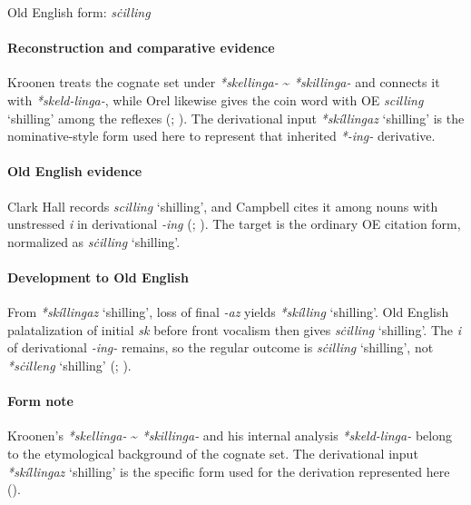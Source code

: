 \documentclass[
  british,
  a4paper,
]{article}
\providecommand{\Recon}[1]{\emph{*#1}}
\begin{document}
Old English form: \emph{sċilling}

\paragraph{Reconstruction and comparative
evidence}\label{reconstruction-and-comparative-evidence-51}

Kroonen treats the cognate set under \emph{*skellinga-}
\textasciitilde{} \emph{*skillinga-} and connects it with
\emph{*skeld-linga-}, while Orel likewise gives the coin word with OE
{\emph{scilling}} `shilling' among the reflexes
(; ). The derivational input \Recon{skíllingaz} `shilling' is the
nominative-style form used here to represent that inherited
\emph{*-ing-} derivative.

\paragraph{Old English evidence}\label{old-english-evidence-53}

Clark Hall records \emph{scilling} `shilling', and Campbell cites it
among nouns with unstressed \emph{i} in derivational \emph{-ing}
(;
). The target is the ordinary
OE citation form, normalized as \emph{sċilling} `shilling'.

\paragraph{Development to Old
English}\label{development-to-old-english-52}

From \Recon{skíllingaz} `shilling', loss of final \emph{-az} yields
\Recon{skílling} `shilling'. Old English palatalization of initial
\emph{sk} before front vocalism then gives \emph{sċilling} `shilling'.
The \emph{i} of derivational \emph{-ing-} remains, so the regular
outcome is \emph{sċilling} `shilling', not \Recon{sċilleng} `shilling'
(;
).

\paragraph{Form note}\label{form-note-14}

Kroonen's \emph{*skellinga-} \textasciitilde{} \emph{*skillinga-} and
his internal analysis \emph{*skeld-linga-} belong to the etymological
background of the cognate set. The derivational input \Recon{skíllingaz}
`shilling' is the specific form used for the derivation represented here
().
\end{document}
